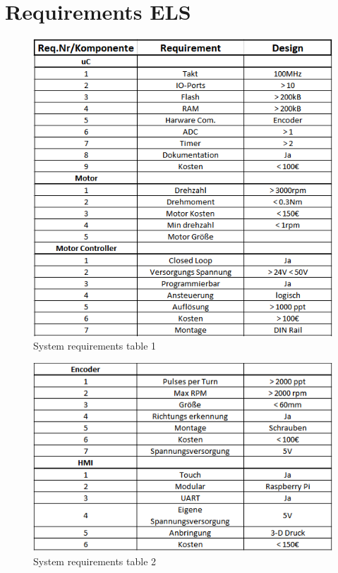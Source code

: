 \chapter{Requirements ELS}
\label{AppendixRequirements}
\begin{figure}[!h]
    \includegraphics[width=12cm]{Pictures/AppRequ1.png}
    \caption[System requirements table 1]{System requirements table 1}
\end{figure}

\begin{figure}[!h]
    \includegraphics[width=12cm]{Pictures/AppRequ2.png}
    \caption[System requirements table 2]{System requirements table 2}
\end{figure}